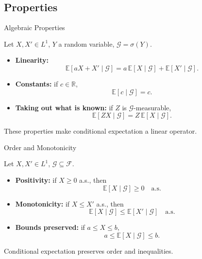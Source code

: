 \documentclass[aspectratio=169]{beamer}
\begin{document}
\subsection{Properties}

\begin{frame}{Algebraic Properties}

Let \(X,X'\in L^1\), \(Y\) a random variable, \(\mathcal{G}=\sigma(Y)\).
\pause
\begin{itemize}
  \item \textbf{Linearity:}
  \[
  \mathbb{E}[aX+X'\mid\mathcal{G}]
  =
  a\,\mathbb{E}[X\mid\mathcal{G}]
  +\mathbb{E}[X'\mid\mathcal{G}].
  \]
\pause
  \item \textbf{Constants:}
  if \(c\in\mathbb{R}\),
  \[
  \mathbb{E}[c\mid\mathcal{G}]=c.
  \]
\pause
  \item \textbf{Taking out what is known:}
  if \(Z\) is \(\mathcal{G}\)-measurable,
  \[
  \mathbb{E}[ZX\mid\mathcal{G}]
  =
  Z\,\mathbb{E}[X\mid\mathcal{G}].
  \]\pause
\end{itemize}

\medskip

These properties make conditional expectation a linear operator.

\end{frame}

\begin{frame}{Order and Monotonicity}

Let \(X,X'\in L^1\), \(\mathcal{G}\subseteq\mathcal{F}\).

\begin{itemize}
  \item \textbf{Positivity:}
  if \(X\ge0\) a.s., then
  \[
  \mathbb{E}[X\mid\mathcal{G}]\ge0 \quad \text{a.s.}
  \]\pause

  \item \textbf{Monotonicity:}
  if \(X\le X'\) a.s., then
  \[
  \mathbb{E}[X\mid\mathcal{G}]
  \le
  \mathbb{E}[X'\mid\mathcal{G}]
  \quad \text{a.s.}
  \]\pause

  \item \textbf{Bounds preserved:}
  if \(a\le X\le b\),
  \[
  a \le \mathbb{E}[X\mid\mathcal{G}] \le b.
  \]\pause
\end{itemize}

\medskip

Conditional expectation preserves order and inequalities.

\end{frame}
\end{document}

